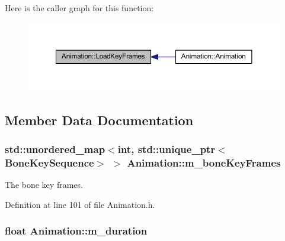 Here is the caller graph for this function\+:\nopagebreak
\begin{figure}[H]
\begin{center}
\leavevmode
\includegraphics[width=350pt]{class_animation_a49ed3e1b94f6b2e98052071a61aac4a5_icgraph}
\end{center}
\end{figure}




\subsection{Member Data Documentation}
\subsubsection[{\texorpdfstring{m\+\_\+bone\+Key\+Frames}{m_boneKeyFrames}}]{\setlength{\rightskip}{0pt plus 5cm}std\+::unordered\+\_\+map$<$int, std\+::unique\+\_\+ptr$<${\bf Bone\+Key\+Sequence}$>$ $>$ Animation\+::m\+\_\+bone\+Key\+Frames\hspace{0.3cm}{\ttfamily [private]}}\hypertarget{class_animation_a60b1ec3d3b1c19d6682b0e17d41be5e8}{}\label{class_animation_a60b1ec3d3b1c19d6682b0e17d41be5e8}


The bone key frames. 



Definition at line 101 of file Animation.\+h.

\subsubsection[{\texorpdfstring{m\+\_\+duration}{m_duration}}]{\setlength{\rightskip}{0pt plus 5cm}float Animation\+::m\+\_\+duration\hspace{0.3cm}{\ttfamily [private]}}\hypertarget{class_animation_af74df305fff20e019837dd3f2351befa}{}\label{class_animation_af74df305fff20e019837dd3f2351befa}


